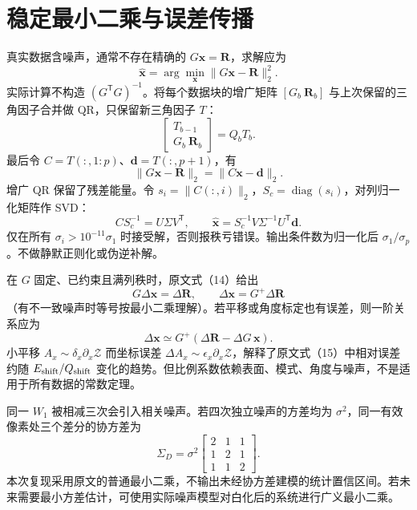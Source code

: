 \documentclass[UTF8,a4paper,zihao=-4]{ctexart}
\newcommand{\ZZ}{\mathcal Z}
\newcommand{\diag}{\operatorname{diag}}
\begin{document}
\section{稳定最小二乘与误差传播}
真实数据含噪声，通常不存在精确的 $G\bm x=\bm R$，求解应为
\begin{equation}
\widehat{\bm x}=\arg\min_{\bm x}\|G\bm x-\bm R\|_2^2.
\end{equation}
实际计算不构造 $(G^{\mathsf T}G)^{-1}$。将每个数据块的增广矩阵 $[G_b\ \bm R_b]$ 与上次保留的三角因子合并做 QR，只保留新三角因子 $T$：
\begin{equation}
\begin{bmatrix}T_{b-1}\\G_b\ \bm R_b\end{bmatrix}=Q_bT_b.
\end{equation}
最后令 $C=T(:,1:p)$、$\bm d=T(:,p+1)$，有
\begin{equation}
\|G\bm x-\bm R\|_2=\|C\bm x-\bm d\|_2.
\end{equation}
增广 QR 保留了残差能量。令 $s_i=\|C(:,i)\|_2$，$S_c=\diag(s_i)$，对列归一化矩阵作 SVD：
\begin{equation}
C S_c^{-1}=U\Sigma V^{\mathsf T},\qquad
\widehat{\bm x}=S_c^{-1}V\Sigma^{-1}U^{\mathsf T}\bm d.
\end{equation}
仅在所有 $\sigma_i>10^{-11}\sigma_1$ 时接受解，否则报秩亏错误。输出条件数为归一化后 $\sigma_1/\sigma_p$。不做静默正则化或伪逆补解。

在 $G$ 固定、已约束且满列秩时，原文式（14）给出
\begin{equation}
G\Delta\bm x=\Delta\bm R,\qquad
\Delta\bm x=G^+\Delta\bm R
\end{equation}
（有不一致噪声时等号按最小二乘理解）。若平移或角度标定也有误差，则一阶关系应为
\begin{equation}
\Delta\bm x\simeq G^+(\Delta\bm R-\Delta G\,\bm x).
\end{equation}
小平移 $A_x\sim\delta_x\partial_x\ZZ$ 而坐标误差 $\Delta A_x\sim\epsilon_x\partial_x\ZZ$，解释了原文式（15）中相对误差约随 $E_{\rm shift}/Q_{\rm shift}$ 变化的趋势。但比例系数依赖表面、模式、角度与噪声，不是适用于所有数据的常数定理。

同一 $W_1$ 被相减三次会引入相关噪声。若四次独立噪声的方差均为 $\sigma^2$，同一有效像素处三个差分的协方差为
\begin{equation}
\Sigma_D=\sigma^2\begin{bmatrix}2&1&1\\1&2&1\\1&1&2\end{bmatrix}.
\end{equation}
本次复现采用原文的普通最小二乘，不输出未经协方差建模的统计置信区间。若未来需要最小方差估计，可使用实际噪声模型对白化后的系统进行广义最小二乘。
\end{document}
